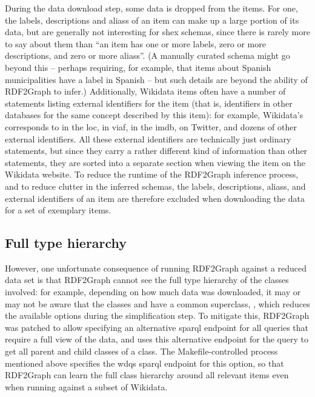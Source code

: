 During the data download step, some data is dropped from the \glspl{item}.
For one, the \glspl{label}, \glspl{description} and \glspl{alias} of an \gls{item} can make up a large portion of its data,
but are generally not interesting for \gls{shex} schemas,
since there is rarely more to say about them than
“an \gls{item} has one or more \glspl{label}, zero or more \glspl{description}, and zero or more \glspl{alias}”. %
(A manually curated \gls{schema} might go beyond this –
perhaps requiring, for example, that \glspl{item} about Spanish municipalities have a label in Spanish –
but such details are beyond the ability of \gls{RDF2Graph} to infer.)
Additionally, \gls{Wikidata} \glspl{item} often have a number of \glspl{statement} listing external identifiers for the \gls{item}
(that is, identifiers in other databases for the same concept described by this \gls{item}):
for example, \gls{Wikidata}’s  corresponds to  in the \gls{loc},
 in \gls{viaf},
 in the \gls{imdb},
 on Twitter,
and dozens of other external identifiers. %
All these external identifiers are technically just ordinary \glspl{statement},
but since they carry a rather different kind of information than other \glspl{statement},
they are sorted into a separate section when viewing the \gls{item} on the \gls{Wikidata} website.
To reduce the runtime of the \gls{RDF2Graph} inference process,
and to reduce clutter in the inferred \glspl{schema},
the \glspl{label}, \glspl{description}, \glspl{alias}, and external identifiers of an \gls{item}
are therefore excluded when downloading the data for a set of exemplary \glspl{item}.

\subsection{Full type hierarchy}
\label{subsec:RDF2Graph+Wikidata:Wikidata:hierarchy}

However, one unfortunate consequence of running \gls{RDF2Graph} against a reduced data set
is that \gls{RDF2Graph} cannot see the full type hierarchy of the classes involved:
for example, depending on how much data was downloaded,
it may or may not be aware that the classes  and 
have a common superclass, ,
which reduces the available options during the simplification step. %
To mitigate this, \gls{RDF2Graph} was patched %
to allow specifying an alternative \gls{sparql} endpoint for all queries that require a full view of the data,
and uses this alternative endpoint for the query to get all parent and child classes of a class.
The Makefile-controlled process mentioned above %
specifies the \gls{wdqs} \gls{sparql} endpoint for this option,
so that \gls{RDF2Graph} can learn the full class hierarchy around all relevant items %
even when running against a subset of \gls{Wikidata}. %

